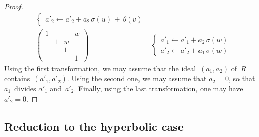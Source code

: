 \documentclass{amsart}
\def\mat#1{\begin{pmatrix}#1\end{pmatrix}}
\begin{document}
\begin{proof}
\begin{equation}
\begin{array}{ll}
\begin{cases}
a'_2 ← a'_2 + a_2 \, σ(u) \,+\, θ(v)\end{cases}\\
\mat{1&&&w\\&1&w&\\ &&1&\\ &&&1} &
\begin{cases} a'_1 ← a'_1 + a_2 \, σ(w) \\
a'_2 ← a'_2 + a_1 \, σ(w) \end{cases}
\end{array}\end{equation}
Using the first transformation, we may assume that
the ideal~$(a_1, a_2)$ of~$R$ contains~$(a'_1, a'_2)$.
Using the second one, we may assume that $a_2 = 0$,
so that $a_1$~divides $a'_1$ and~$a'_2$.
Finally, using the last transformation, one may have~$a'_2 = 0$.
\end{proof}
\subsection{Reduction to the hyperbolic case}
\end{document}
